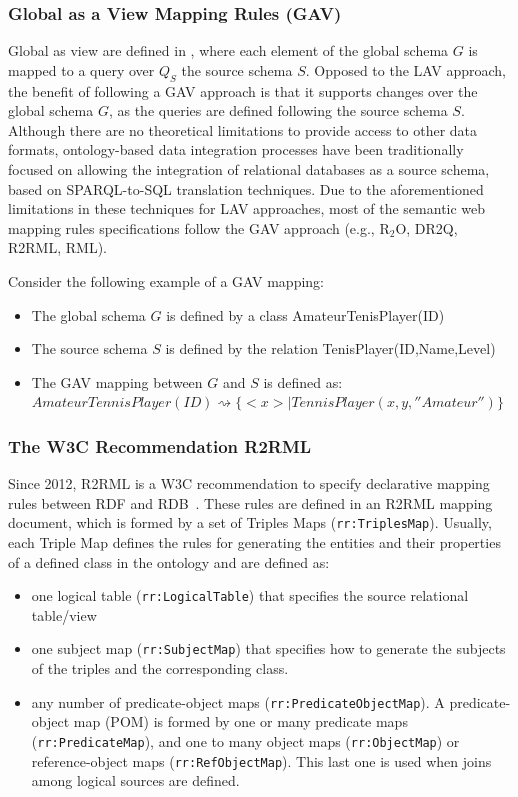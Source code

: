 \subsubsection{Global as a View Mapping Rules (GAV)}
Global as view are defined in \citep{halevy2001answering}, where each element of the global schema $G$ is mapped to a query over $Q_S$ the source schema $S$. Opposed to the LAV approach, the benefit of following a GAV approach is that it supports changes over the global schema $G$, as the queries are defined following the source schema $S$. Although there are no theoretical limitations to provide access to other data formats, ontology-based data integration processes have been traditionally focused on allowing the integration of relational databases as a source schema, based on SPARQL-to-SQL translation techniques. Due to the aforementioned limitations in these techniques for LAV approaches, most of the semantic web mapping rules specifications follow the GAV approach (e.g., R$_2$O, DR2Q, R2RML, RML). 

Consider the following example of a GAV mapping:
\begin{itemize}
    \item The global schema $G$ is defined by a class AmateurTenisPlayer(ID)
    \item The source schema $S$ is defined by the relation TenisPlayer(ID,Name,Level)
    \item The GAV mapping between $G$ and $S$ is defined as:\\
    $AmateurTennisPlayer(ID) \rightsquigarrow \{<x> | TennisPlayer(x,y,''Amateur'')\}$
\end{itemize}

\subsubsection{The W3C Recommendation R2RML}
Since 2012, R2RML is a W3C recommendation to specify declarative mapping rules between RDF and RDB~\citep{R2RML}. These rules are defined in an R2RML mapping document, which is formed by a set of Triples Maps (\texttt{rr:TriplesMap}). Usually, each Triple Map defines the rules for generating the entities and their properties of a defined class in the ontology and are defined as:
\begin{itemize}
    \item one logical table (\texttt{rr:LogicalTable}) that specifies the source relational table/view
    \item one subject map (\texttt{rr:SubjectMap}) that specifies how to generate the subjects of the triples and the corresponding class.
    \item any number of predicate-object maps (\texttt{rr:PredicateObjectMap}). A predicate-object map (POM) is formed by one or many predicate maps (\texttt{rr:PredicateMap}), and one to many object maps (\texttt{rr:ObjectMap}) or reference-object maps (\texttt{rr:RefObjectMap}). This last one is used when joins among logical sources are defined.
\end{itemize}

